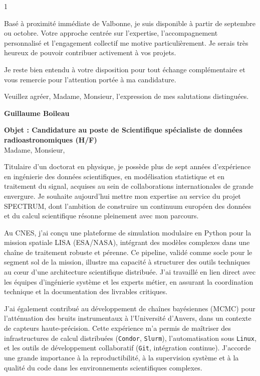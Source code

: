 \documentclass[10pt,a4paper]{altacv}
\begin{document}
\begin{paracol}{1}
{Basé à proximité immédiate de Valbonne, je suis disponible à partir de septembre ou octobre. Votre approche centrée sur l'expertise, l'accompagnement personnalisé et l'engagement collectif me motive particulièrement. Je serais très heureux de pouvoir contribuer activement à vos projets.

Je reste bien entendu à votre disposition pour tout échange complémentaire et vous remercie pour l'attention portée à ma candidature.

Veuillez agréer, Madame, Monsieur, l'expression de mes salutations distinguées.

\textbf{Guillaume Boileau}

\fi
\textbf{Objet : Candidature au poste de Scientifique spécialiste de données radioastronomiques (H/F)} \\


Madame, Monsieur,

Titulaire d’un doctorat en physique, je possède plus de sept années d’expérience en ingénierie des données scientifiques, en modélisation statistique et en traitement du signal, acquises au sein de collaborations internationales de grande envergure. Je souhaite aujourd’hui mettre mon expertise au service du projet SPECTRUM, dont l’ambition de construire un continuum européen des données et du calcul scientifique résonne pleinement avec mon parcours.

Au CNES, j’ai conçu une plateforme de simulation modulaire en Python pour la mission spatiale LISA (ESA/NASA), intégrant des modèles complexes dans une chaîne de traitement robuste et pérenne. Ce pipeline, validé comme socle pour le segment sol de la mission, illustre ma capacité à structurer des outils techniques au cœur d’une architecture scientifique distribuée. J’ai travaillé en lien direct avec les équipes d’ingénierie système et les experts métier, en assurant la coordination technique et la documentation des livrables critiques.

J’ai également contribué au développement de chaînes bayésiennes (MCMC) pour l’atténuation des bruits instrumentaux à l’Université d’Anvers, dans un contexte de capteurs haute-précision. Cette expérience m’a permis de maîtriser des infrastructures de calcul distribuées (\texttt{Condor}, \texttt{Slurm}), l’automatisation sous \texttt{Linux}, et les outils de développement collaboratif (\texttt{Git}, intégration continue). J’accorde une grande importance à la reproductibilité, à la supervision système et à la qualité du code dans les environnements scientifiques complexes.

}
\end{paracol}
\end{document}
